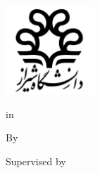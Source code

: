 \begin{titlepage}
    \begin{latin}
        \centering\bfseries
        \includegraphics[width=0.25\textwidth]{assets/shiraz_university_logo.pdf}

        {\latinuniversity}

        \vspace{\baselineskip}
        {\large \latindepartment}

        {\latindegree} {\latintype} in \\ {\latinfield}

        \vspace{3\baselineskip}
        {\Large \latintitle}

        \vspace{3\baselineskip}
        By \\
        {\large \latinname}

        \vspace{2\baselineskip}
        Supervised by \\
        {\large \latinsupervisor}

        \vspace{\baselineskip}
        {\large \latindate}
    \end{latin}
\end{titlepage}
